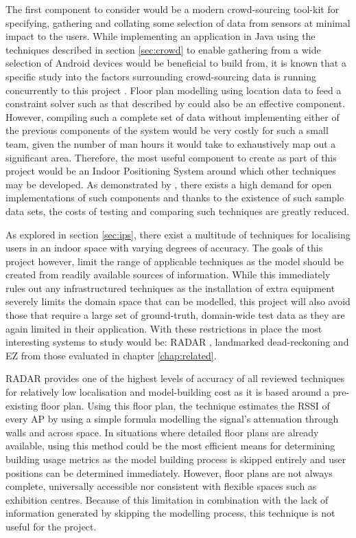 \documentclass{UoYCSproject}
\begin{document}
        The first component to consider would be a modern crowd-sourcing tool-kit for specifying, gathering and collating some selection of data from sensors at minimal impact to the users. While implementing an application in Java using the techniques described in section \ref{sec:crowd} to enable gathering from a wide selection of Android devices would be beneficial to build from, it is known that a specific study into the factors surrounding crowd-sourcing data is running concurrently to this project \citep{IainBate}. Floor plan modelling using location data to feed a constraint solver such as that described by \citet{charman1994constraint} could also be an effective component. However, compiling such a complete set of data without implementing either of the previous components of the system would be very costly for such a small team, given the number of man hours it would take to exhaustively map out a significant area. Therefore, the most useful component to create as part of this project would be an Indoor Positioning System around which other techniques may be developed. As demonstrated by \citet{torres2014ujiindoorloc}, there exists a high demand for open implementations of such components and thanks to the existence of such sample data sets, the costs of testing and comparing such techniques are greatly reduced.
        
        As explored in section \ref{sec:ips}, there exist a multitude of techniques for localising users in an indoor space with varying degrees of accuracy. The goals of this project however, limit the range of applicable techniques as the model should be created from readily available sources of information. While this immediately rules out any infrastructured techniques as the installation of extra equipment severely limits the domain space that can be modelled, this project will also avoid those that require a large set of ground-truth, domain-wide test data as they are again limited in their application. With these restrictions in place the most interesting systems to study would be: RADAR \citep{bahl2000radar}, landmarked dead-reckoning \citep{wang2012no} and EZ \citep{chintalapudi2010indoor} from those evaluated in chapter \ref{chap:related}.
        
        RADAR provides one of the highest levels of accuracy of all reviewed techniques for relatively low localisation and model-building cost as it is based around a pre-existing floor plan. Using this floor plan, the technique estimates the RSSI of every AP by using a simple formula modelling the signal's attenuation through walls and across space. In situations where detailed floor plans are already available, using this method could be the most efficient means for determining building usage metrics as the model building process is skipped entirely and user positions can be determined immediately. However, floor plans are not always complete, universally accessible nor consistent with flexible spaces such as exhibition centres. Because of this limitation in combination with the lack of information generated by skipping the modelling process, this technique is not useful for the project.
        
\end{document}
